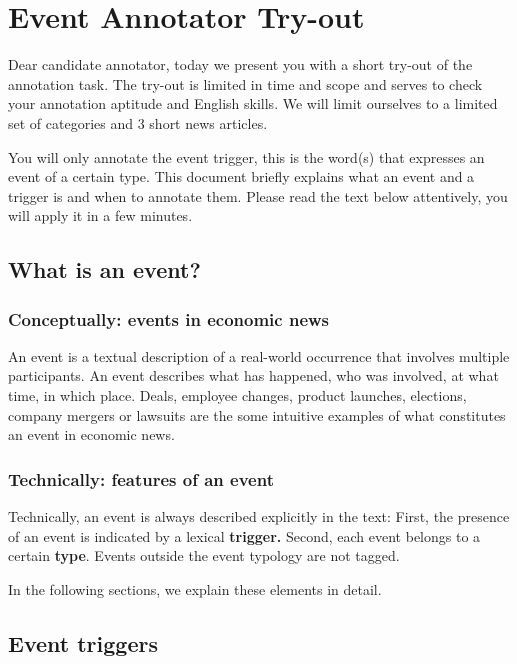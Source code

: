 \documentclass[a4paper]{report}
\begin{document}
\chapter*{\project Event Annotator Try-out}

Dear candidate annotator, today we present you with a short try-out of the annotation task.
The try-out is limited in time and scope and serves to check your annotation aptitude and English skills.
We will limit ourselves to a limited set of categories and 3 short news articles.

You will only annotate the event trigger, this is the word(s) that expresses an event of a certain type.
This document briefly explains what an event and a trigger is and when to annotate them.
Please read the text below attentively, you will apply it in a few minutes.

\section{What is an event?}

\subsection*{Conceptually: events in economic news}

An event is a textual description of a real-world occurrence that involves multiple participants.
An event describes what has happened, who was involved, at what time, in which place.
Deals, employee changes, product launches, elections, company mergers or lawsuits are the some intuitive examples of what constitutes an event in economic news. 

\subsection*{Technically: features of an event}

Technically, an event is always described explicitly in the text:
First, the presence of an event is indicated by a lexical \textbf{trigger.}
Second, each event belongs to a certain \textbf{type}.
Events outside the event typology are not tagged.

In the following sections, we explain these elements in detail.

\section{Event triggers}
\end{document}
